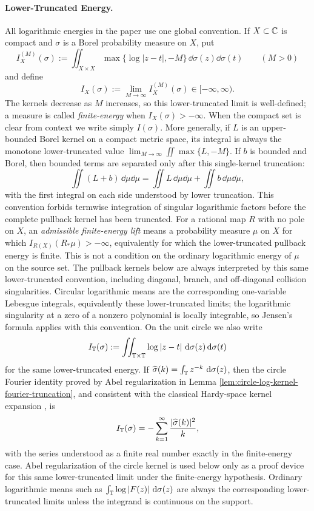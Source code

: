 \paragraph{Lower-Truncated Energy.}
All logarithmic energies in the paper use one global convention.  If \(X\subset\mathbb{C}\) is compact and \(\sigma\) is a Borel probability measure on \(X\), put
\[
I_X^{(M)}(\sigma):=\iint_{X\times X}\max\{\log|z-t|,-M\}\,\dd\sigma(z)\dd\sigma(t)
\qquad(M>0)
\]
and define
\[
I_X(\sigma):=\lim_{M\to\infty}I_X^{(M)}(\sigma)\in[-\infty,\infty).
\]
The kernels decrease as \(M\) increases, so this lower-truncated limit is well-defined; a measure is called \emph{finite-energy} when \(I_X(\sigma)>-\infty\).  When the compact set is clear from context we write simply \(I(\sigma)\).  More generally, if \(L\) is an upper-bounded Borel kernel on a compact metric space, its integral is always the monotone lower-truncated value \(\lim_{M\to\infty}\iint\max\{L,-M\}\).  If \(b\) is bounded and Borel, then bounded terms are separated only after this single-kernel truncation:
\[
\iint(L+b)\,\dd\mu\dd\mu=\iint L\,\dd\mu\dd\mu+\iint b\,\dd\mu\dd\mu,
\]
with the first integral on each side understood by lower truncation.  This convention forbids termwise integration of singular logarithmic factors before the complete pullback kernel has been truncated.  For a rational map \(R\) with no pole on \(X\), an \emph{admissible finite-energy lift} means a probability measure \(\mu\) on \(X\) for which \(I_{R(X)}(R_\ast\mu)>-\infty\), equivalently for which the lower-truncated pullback energy is finite.  This is not a condition on the ordinary logarithmic energy of \(\mu\) on the source set.  The pullback kernels below are always interpreted by this same lower-truncated convention, including diagonal, branch, and off-diagonal collision singularities.  Circular logarithmic means are the corresponding one-variable Lebesgue integrals, equivalently these lower-truncated limits; the logarithmic singularity at a zero of a nonzero polynomial is locally integrable, so Jensen's formula applies with this convention.  On the unit circle we also write
\[
I_{\mathbb{T}}(\sigma):=\iint_{\mathbb{T}\times\mathbb{T}}\log|z-t|\,\,\mathrm{d}\sigma(z)\,\mathrm{d}\sigma(t)
\]
for the same lower-truncated energy.  If \(\widehat\sigma(k)=\int_{\mathbb{T}}z^{-k}\,\,\mathrm{d}\sigma(z)\), then the circle Fourier identity proved by Abel regularization in Lemma \ref{lem:circle-log-kernel-fourier-truncation}, and consistent with the classical Hardy-space kernel expansion \citep[Chap.~1]{Duren1970}, is
\[
I_{\mathbb{T}}(\sigma)=-\sum_{k=1}^{\infty}\frac{|\widehat\sigma(k)|^2}{k},
\]
with the series understood as a finite real number exactly in the finite-energy case.  Abel regularization of the circle kernel is used below only as a proof device for this same lower-truncated limit under the finite-energy hypothesis.  Ordinary logarithmic means such as \(\int_{\mathbb{T}}\log|F(z)|\,\,\mathrm{d}\sigma(z)\) are always the corresponding lower-truncated limits unless the integrand is continuous on the support.

